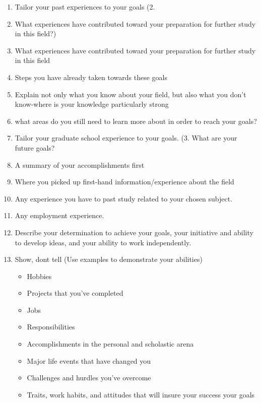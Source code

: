 \documentclass[a4paper,12pt]{article}%
\begin{document}
  \begin{enumerate}
	\item  Tailor your past experiences to your goals  (2.	
	\item What experiences have contributed toward your preparation for further study in this field?)  
\item What experiences have contributed toward your preparation for further study in this field
			\item Steps you have already taken towards these goals   
\item	Explain not only what you know about your field, but also what you don't know-where is your knowledge particularly strong 
\item what areas do you still need to learn more about in order to reach your goals?\\
	  \hrulefill
	  
	  \hrulefill
	  
	\item  Tailor your graduate school experience to your goals. (3.	What are your future goals?  		\item	A summary of your accomplishments first
					\item		Where you picked up first-hand information/experience about the field
	\item 		 	Any experience you have to past study related to your chosen subject.
	\item 		 	Any employment experience.
	\item Describe your determination to achieve your goals, your initiative and ability to develop ideas, and your ability to work independently.\\
		  \hrulefill
		  
	  \hrulefill
	  
	\item Show, dont tell (Use examples to demonstrate your abilities)
\begin{itemize}
	\item Hobbies 
	\item Projects that you've completed
	\item Jobs
	\item Responsibilities
	\item Accomplishments in the personal and scholastic arena
	\item Major life events that have changed you
	\item Challenges and hurdles you've overcome
 	\item Traits, work habits, and attitudes that will insure your success your goals
\end{itemize}
	  \hrulefill
	  

\end{enumerate}
\end{document}
